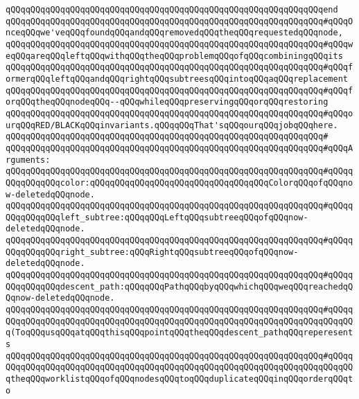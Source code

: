 \verb|qQQqqQQqqQQqqQQqqQQqqQQqqQQqqQQqqQQqqQQqqQQqqQQqqQQqqQQqqQQqqQQqend|\newline
\newline
\verb|qQQqqQQqqQQqqQQqqQQqqQQqqQQqqQQqqQQqqQQqqQQqqQQqqQQqqQQqqQQqqQQq#qQQqOnceqQQqwe'veqQQqfoundqQQqandqQQqremovedqQQqtheqQQqrequestedqQQqnode,|\newline
\verb|qQQqqQQqqQQqqQQqqQQqqQQqqQQqqQQqqQQqqQQqqQQqqQQqqQQqqQQqqQQqqQQq#qQQqweqQQqareqQQqleftqQQqwithqQQqtheqQQqproblemqQQqofqQQqcombiningqQQqits|\newline
\verb|qQQqqQQqqQQqqQQqqQQqqQQqqQQqqQQqqQQqqQQqqQQqqQQqqQQqqQQqqQQqqQQq#qQQqformerqQQqleftqQQqandqQQqrightqQQqsubtreesqQQqintoqQQqaqQQqreplacement|\newline
\verb|qQQqqQQqqQQqqQQqqQQqqQQqqQQqqQQqqQQqqQQqqQQqqQQqqQQqqQQqqQQqqQQq#qQQqforqQQqtheqQQqnodeqQQq--qQQqwhileqQQqpreservingqQQqorqQQqrestoring|\newline
\verb|qQQqqQQqqQQqqQQqqQQqqQQqqQQqqQQqqQQqqQQqqQQqqQQqqQQqqQQqqQQqqQQq#qQQqourqQQqRED/BLACKqQQqinvariants.qQQqqQQqThat'sqQQqourqQQqjobqQQqhere.|\newline
\verb|qQQqqQQqqQQqqQQqqQQqqQQqqQQqqQQqqQQqqQQqqQQqqQQqqQQqqQQqqQQqqQQq#|\newline
\verb|qQQqqQQqqQQqqQQqqQQqqQQqqQQqqQQqqQQqqQQqqQQqqQQqqQQqqQQqqQQqqQQq#qQQqArguments:|\newline
\verb|qQQqqQQqqQQqqQQqqQQqqQQqqQQqqQQqqQQqqQQqqQQqqQQqqQQqqQQqqQQqqQQq#qQQqqQQqqQQqqQQqcolor:qQQqqQQqqQQqqQQqqQQqqQQqqQQqqQQqqQQqColorqQQqofqQQqnow-deletedqQQqnode.|\newline
\verb|qQQqqQQqqQQqqQQqqQQqqQQqqQQqqQQqqQQqqQQqqQQqqQQqqQQqqQQqqQQqqQQq#qQQqqQQqqQQqqQQqleft_subtree:qQQqqQQqLeftqQQqsubtreeqQQqofqQQqnow-deletedqQQqnode.|\newline
\verb|qQQqqQQqqQQqqQQqqQQqqQQqqQQqqQQqqQQqqQQqqQQqqQQqqQQqqQQqqQQqqQQq#qQQqqQQqqQQqqQQqright_subtree:qQQqRightqQQqsubtreeqQQqofqQQqnow-deletedqQQqnode.|\newline
\verb|qQQqqQQqqQQqqQQqqQQqqQQqqQQqqQQqqQQqqQQqqQQqqQQqqQQqqQQqqQQqqQQq#qQQqqQQqqQQqqQQqdescent_path:qQQqqQQqPathqQQqbyqQQqwhichqQQqweqQQqreachedqQQqnow-deletedqQQqnode.|\newline
\verb|qQQqqQQqqQQqqQQqqQQqqQQqqQQqqQQqqQQqqQQqqQQqqQQqqQQqqQQqqQQqqQQq#qQQqqQQqqQQqqQQqqQQqqQQqqQQqqQQqqQQqqQQqqQQqqQQqqQQqqQQqqQQqqQQqqQQqqQQqqQQq(ToqQQqusqQQqatqQQqthisqQQqpointqQQqtheqQQqdescent_pathqQQqreperesents|\newline
\verb|qQQqqQQqqQQqqQQqqQQqqQQqqQQqqQQqqQQqqQQqqQQqqQQqqQQqqQQqqQQqqQQq#qQQqqQQqqQQqqQQqqQQqqQQqqQQqqQQqqQQqqQQqqQQqqQQqqQQqqQQqqQQqqQQqqQQqqQQqqQQqtheqQQqworklistqQQqofqQQqnodesqQQqtoqQQqduplicateqQQqinqQQqorderqQQqto|\newline
